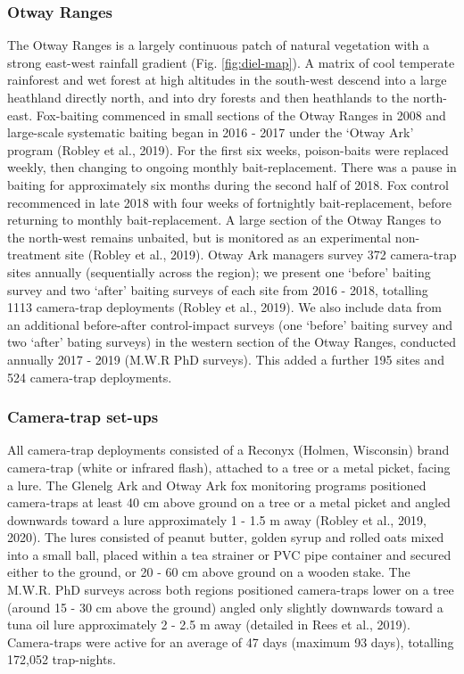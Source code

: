 \documentclass[]{elsarticle} %
\begin{document}
\hypertarget{otway-ranges}{%
\subsubsection{Otway Ranges}\label{otway-ranges}}

The Otway Ranges is a largely continuous patch of natural vegetation with a strong east-west rainfall gradient (Fig. \ref{fig:diel-map}). A matrix of cool temperate rainforest and wet forest at high altitudes in the south-west descend into a large heathland directly north, and into dry forests and then heathlands to the north-east. Fox-baiting commenced in small sections of the Otway Ranges in 2008 and large-scale systematic baiting began in 2016 - 2017 under the `Otway Ark' program (Robley et al., 2019). For the first six weeks, poison-baits were replaced weekly, then changing to ongoing monthly bait-replacement. There was a pause in baiting for approximately six months during the second half of 2018. Fox control recommenced in late 2018 with four weeks of fortnightly bait-replacement, before returning to monthly bait-replacement. A large section of the Otway Ranges to the north-west remains unbaited, but is monitored as an experimental non-treatment site (Robley et al., 2019). Otway Ark managers survey 372 camera-trap sites annually (sequentially across the region); we present one `before' baiting survey and two `after' baiting surveys of each site from 2016 - 2018, totalling 1113 camera-trap deployments (Robley et al., 2019). We also include data from an additional before-after control-impact surveys (one `before' baiting survey and two `after' bating surveys) in the western section of the Otway Ranges, conducted annually 2017 - 2019 (M.W.R PhD surveys). This added a further 195 sites and 524 camera-trap deployments.

\hypertarget{camera-trap-set-ups}{%
\subsubsection{Camera-trap set-ups}\label{camera-trap-set-ups}}

All camera-trap deployments consisted of a Reconyx (Holmen, Wisconsin) brand camera-trap (white or infrared flash), attached to a tree or a metal picket, facing a lure. The Glenelg Ark and Otway Ark fox monitoring programs positioned camera-traps at least 40 cm above ground on a tree or a metal picket and angled downwards toward a lure approximately 1 - 1.5 m away (Robley et al., 2019, 2020). The lures consisted of peanut butter, golden syrup and rolled oats mixed into a small ball, placed within a tea strainer or PVC pipe container and secured either to the ground, or 20 - 60 cm above ground on a wooden stake. The M.W.R. PhD surveys across both regions positioned camera-traps lower on a tree (around 15 - 30 cm above the ground) angled only slightly downwards toward a tuna oil lure approximately 2 - 2.5 m away (detailed in Rees et al., 2019). Camera-traps were active for an average of 47 days (maximum 93 days), totalling 172,052 trap-nights.
\end{document}
